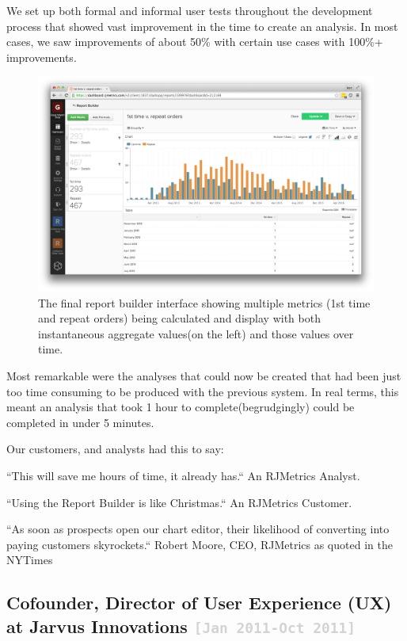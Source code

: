 \documentclass{tufte-handout}
\newcommand{\shstandout}[1]{\textbf{\textcolor{BurntOrange}{#1}}}
\newcommand{\shyears}[1]{\small{\texttt{\textcolor{LightGray}{#1}}}}
\begin{document}
We set up both formal and informal user tests throughout the development process that showed vast improvement in the time to create an analysis. In most cases, we saw improvements of about 50\% with certain use cases with 100\%+ improvements.

\begin{figure}%
  \includegraphics[width=\linewidth]{report_builder}
  \caption{The final report builder interface showing multiple metrics (1st time and repeat orders) being calculated and display with both instantaneous aggregate values(on the left) and those values over time.}
  \label{fig:report_builder}
\end{figure}

\pagebreak

Most remarkable were the analyses that could now be created that had been just too time consuming to be produced with the previous system. In real terms, this meant an analysis that took 1 hour to complete(begrudgingly) could be completed in under 5 minutes.

Our customers, and analysts had this to say:

``This will save me hours of time, it already has.``
An RJMetrics Analyst.

``Using the Report Builder is like Christmas.``
An RJMetrics Customer.

``As soon as prospects open our chart editor, their likelihood of converting into paying customers skyrockets.``
Robert Moore, CEO, RJMetrics as quoted in the NYTimes

\subsection{\textbf{Cofounder, Director of User Experience (UX)} at \shstandout{Jarvus Innovations} \shyears{[Jan 2011-Oct 2011]}}
\end{document}
